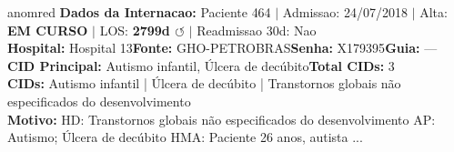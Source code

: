 \documentclass[a4paper,10pt]{article}
\begin{document}
\begin{anomalycard}[Internacao 93 | GHO-PETROBRAS | CRITICO (z=5.03)]{anomred}
\textbf{Dados da Internacao:} Paciente 464 $\mid$ Admissao: 24/07/2018 $\mid$ Alta: \textcolor{anomorange}{\textbf{EM CURSO}} $\mid$ LOS: \textbf{2799d \textcolor{anomorange}{$\circlearrowleft$}} $\mid$ Readmissao 30d: Nao\\
\textbf{Hospital:} Hospital 13\quad\textbf{Fonte:} GHO-PETROBRAS\quad\textbf{Senha:} X179395\quad\textbf{Guia:} ---\\
\textbf{CID Principal:} {\small Autismo infantil, Úlcera de decúbito}\quad\textbf{Total CIDs:} 3\\

\textbf{CIDs:} {\scriptsize Autismo infantil | Úlcera de decúbito | Transtornos globais não especificados do desenvolvimento}\\

\textbf{Motivo:} {\scriptsize HD: Transtornos globais não especificados do desenvolvimento  AP: Autismo; Úlcera de decúbito  HMA: Paciente 26 anos, autista ...}\\


\end{anomalycard}
\end{document}

